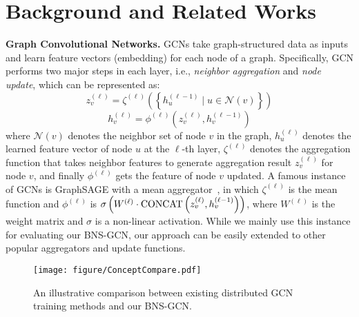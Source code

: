 \documentclass{article}
\newcommand{\niparagraph}[1]{\noindent\textbf{#1}}
\begin{document}
 \section{Background and Related Works}
\niparagraph{Graph Convolutional Networks.}
GCNs take graph-structured data as inputs and learn feature vectors (embedding) for each node of a graph.
Specifically,
GCN performs two major steps in each layer, i.e., \textit{neighbor aggregation} and \textit{node update}, which can be represented as:
\begin{equation}
z^{(\ell)}_v=\zeta^{(\ell)}\left(\left\{h^{(\ell-1)}_u\mid u\in\mathcal{N}(v)\right\}\right)\label{fml:aggr}
\end{equation}
\begin{equation}
h^{(\ell)}_v=\phi^{(\ell)}\left(z^{(\ell)}_v,h^{(\ell-1)}_v\right)\label{fml:update}
\end{equation}
where $\mathcal{N}(v)$ denotes the neighbor set of node $v$ in the graph, $h^{(\ell)}_u$ denotes the learned feature vector of node $u$ at the $\ell$-th layer, 
$\zeta^{(\ell)}$ denotes the aggregation function that takes neighbor features to generate aggregation result $z_v^{(\ell)}$ for node $v$, and finally $\phi^{(\ell)}$ gets the feature of node $v$ updated. 
A famous instance of GCNs is GraphSAGE with a mean aggregator~\citep{hamilton2017inductive}, in which $\zeta^{(\ell)}$ is the mean function and $\phi^{(\ell)}$ is $ \sigma\left(W^{(\ell)}\cdot\textup{CONCAT}\left(z^{(\ell)}_v,h^{(\ell-1)}_v\right)\right)$, where $W^{(\ell)}$ is the weight matrix and $\sigma$ is a non-linear activation. While we mainly use this instance for evaluating our BNS-GCN, our approach can be easily extended to other popular aggregators and update functions.
\begin{figure*}[!t]
    \begin{center}
    \texttt{[image: figure/ConceptCompare.pdf]}
    \end{center}
    \caption{An illustrative comparison between existing distributed GCN training methods and our BNS-GCN.}
    \label{fig:ConceptCompare}
\end{figure*}
\end{document}
